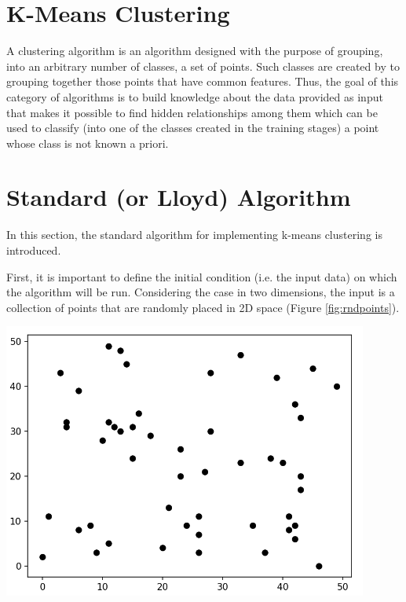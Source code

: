 \documentclass{report}
\begin{document}
\begin{minipage}[b]{0.48\textwidth}
    \section*{K-Means Clustering}
    A clustering algorithm is an algorithm designed with the purpose of grouping, into an arbitrary number of classes, a set of points. Such classes are created by to grouping together those points that have common features. Thus, the goal of this category of algorithms is to build knowledge about the data provided as input that makes it possible to find hidden relationships among them which can be used to classify (into one of the classes created in the training stages) a point whose class is not known a priori.
  
    \section*{Standard (or Lloyd) Algorithm}
    In this section, the standard algorithm for implementing k-means clustering is introduced. 
  
    First, it is important to define the initial condition (i.e. the input data) on which the algorithm will be run. Considering the case in two dimensions, the input is a collection of points that are randomly placed in 2D space (Figure \ref{fig:rndpoints}).
  
    \begin{center} 
        \includegraphics[width = 0.9\textwidth]{imgs/rndpoints.png}
        \label{fig:rndpoints}
    \end{center}
  

\end{minipage}
\end{document}
